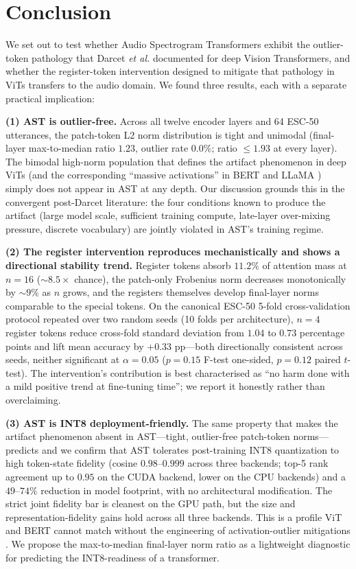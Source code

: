 \documentclass[conference]{IEEEtran}
\begin{document}
\section{Conclusion}

We set out to test whether Audio Spectrogram Transformers exhibit the outlier-token pathology that Darcet \emph{et al.} documented for deep Vision Transformers, and whether the register-token intervention designed to mitigate that pathology in ViTs transfers to the audio domain. We found three results, each with a separate practical implication:

\textbf{(1) AST is outlier-free.} Across all twelve encoder layers and 64 ESC-50 utterances, the patch-token L2 norm distribution is tight and unimodal (final-layer max-to-median ratio $1.23$, outlier rate $0.0\%$; ratio $\leq 1.93$ at every layer). The bimodal high-norm population that defines the artifact phenomenon in deep ViTs (and the corresponding ``massive activations'' in BERT and LLaMA \cite{sun2024massive}) simply does not appear in AST at any depth. Our discussion grounds this in the convergent post-Darcet literature: the four conditions known to produce the artifact (large model scale, sufficient training compute, late-layer over-mixing pressure, discrete vocabulary) are jointly violated in AST's training regime.

\textbf{(2) The register intervention reproduces mechanistically and shows a directional stability trend.} Register tokens absorb $11.2\%$ of attention mass at $n{=}16$ ($\sim 8.5\times$ chance), the patch-only Frobenius norm decreases monotonically by $\sim 9\%$ as $n$ grows, and the registers themselves develop final-layer norms comparable to the special tokens. On the canonical ESC-50 5-fold cross-validation protocol repeated over two random seeds (10 folds per architecture), $n{=}4$ register tokens reduce cross-fold standard deviation from $1.04$ to $0.73$ percentage points and lift mean accuracy by $+0.33$ pp---both directionally consistent across seeds, neither significant at $\alpha=0.05$ ($p=0.15$ F-test one-sided, $p=0.12$ paired $t$-test). The intervention's contribution is best characterised as ``no harm done with a mild positive trend at fine-tuning time''; we report it honestly rather than overclaiming.

\textbf{(3) AST is INT8 deployment-friendly.} The same property that makes the artifact phenomenon absent in AST---tight, outlier-free patch-token norms---predicts and we confirm that AST tolerates post-training INT8 quantization to high token-state fidelity (cosine $0.98$--$0.999$ across three backends; top-5 rank agreement up to $0.95$ on the CUDA backend, lower on the CPU backends) and a $49$--$74\%$ reduction in model footprint, with no architectural modification. The strict joint fidelity bar is cleanest on the GPU path, but the size and representation-fidelity gains hold across all three backends. This is a profile ViT and BERT cannot match without the engineering of activation-outlier mitigations \cite{bondarenko2023quantizable}. We propose the max-to-median final-layer norm ratio as a lightweight diagnostic for predicting the INT8-readiness of a transformer.
\end{document}

